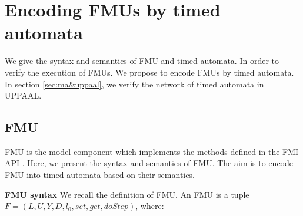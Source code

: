 
\section{Encoding FMUs by timed automata}
\label{sec:fmi}
We give the syntax and semantics of FMU and timed automata. In order to verify the  execution of FMUs. We propose to encode FMUs by timed automata. In section \ref{sec:ma&uppaal}, we verify the network of timed automata in UPPAAL.
\subsection{FMU}
FMU is the model component which implements the methods defined in the FMI API \cite{Tripakis15}. Here, we present the syntax and semantics of FMU. The aim is to encode FMU into timed automata based on their semantics. 
\begin{definition}
\textbf{FMU syntax}
We recall the definition of FMU. An FMU is a tuple $F=(L,U,Y,D,l_{0},set,get,doStep)$, where:
\end{definition}

